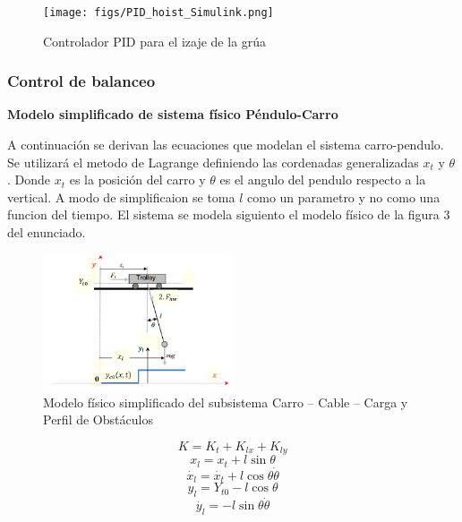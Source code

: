 \documentclass{article}
\begin{document}
            \begin{figure}[H]
                \centering
                \texttt{[image: figs/PID\_hoist\_Simulink.png]}
                \caption{Controlador PID para el izaje de la grúa}
                \label{fig:pid_hoist_simulink}
            \end{figure}
        


        \subsubsection{Control de balanceo}

        \textbf{Modelo simplificado de sistema físico Péndulo-Carro}

            A continuación se derivan las ecuaciones que modelan el sistema carro-pendulo. Se utilizará el metodo de Lagrange definiendo las cordenadas generalizadas 
            \(x_t\) y \(\theta\) . Donde \(x_t\) es la posición del carro y \(\theta\) es el angulo del pendulo respecto a la vertical. 
            A modo de simplificaion se toma \(l\) como un parametro y no como una funcion del tiempo.
            El sistema se modela siguiento el modelo físico de la figura 3 del enunciado.
            \begin{figure}[H]
                \centering
                \includegraphics[width=0.5\textwidth]{figs/figure3_enunciado.png}
                \caption{Modelo físico simplificado del subsistema Carro – Cable – Carga y Perfil de Obstáculos}
                \label{fig:pendulo}
            \end{figure}
            
            \begin{equation}\label{eq:kinetic1}
                K = K_t + K_{lx} + K_{ly}
            \end{equation}
            \begin{equation}\label{eq:xl}
                x_l=x_t+l\sin{\theta}
            \end{equation}
            \begin{equation}\label{eq:dxl}
                \dot{x_l}=\dot{x_t}+l\cos{\theta}\dot{\theta}
            \end{equation}
            \begin{equation}\label{eq:y}
                y_l=Y_{t0}-l\cos{\theta}
            \end{equation}
            \begin{equation}\label{eq:dy}
                \dot{y_l}=-l\sin{\theta}\dot{\theta}
            \end{equation}
\end{document}
